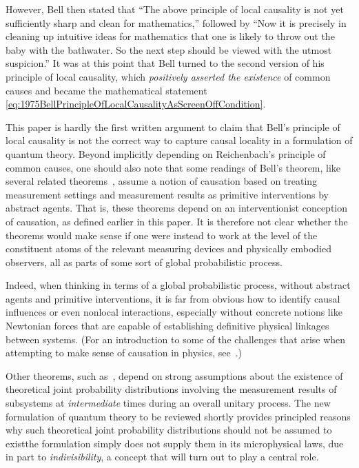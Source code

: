 \documentclass[12pt,english,prl,superscriptaddress,nobibnotes,nofootinbib]{revtex4-2}
\begin{document}
However, Bell then stated that ``The above principle of local causality
is not yet sufficiently sharp and clean for mathematics,'' followed
by ``Now it is precisely in cleaning up intuitive ideas for mathematics
that one is likely to throw out the baby with the bathwater. So the
next step should be viewed with the utmost suspicion.'' It was at
this point that Bell turned to the second version of his principle
of local causality, which \emph{positively asserted the existence}
of common causes and became the mathematical statement \eqref{eq:1975BellPrincipleOfLocalCausalityAsScreenOffCondition}.

This paper is hardly the first written argument to claim that Bell's
principle of local causality is not the correct way to capture causal
locality in a formulation of quantum theory. Beyond implicitly depending
on Reichenbach's principle of common causes, one should also note
that some readings of Bell's theorem, like several related theorems~\citep{ClauserHorneShimonyHolt:1969pettlhvt,GreenbergerHorneZeilinger:1989gbbt},
assume a notion of causation based on treating measurement settings
and measurement results as primitive interventions by abstract agents.
That is, these theorems depend on an interventionist conception of
causation, as defined earlier in this paper. It is therefore not clear
whether the theorems would make sense if one were instead to work
at the level of the constituent atoms of the relevant measuring devices
and physically embodied observers, all as parts of some sort of global
probabilistic process.

Indeed, when thinking in terms of a global probabilistic process,
without abstract agents and primitive interventions, it is far from
obvious how to identify causal influences or even nonlocal interactions,
especially without concrete notions like Newtonian forces that are
capable of establishing definitive physical linkages between systems.
(For an introduction to some of the challenges that arise when attempting
to make sense of causation in physics, see~\citep{Frisch:2024cip}.)

Other theorems, such as~\citep{BongUtrerasAlarconGhafariLiangTischlerCavalcantiPrydeWiseman:2020asngtotwfp},
depend on strong assumptions about the existence of theoretical joint
probability distributions involving the measurement results of subsystems
at \emph{intermediate} times during an overall unitary process. The
new formulation of quantum theory to be reviewed shortly provides
principled reasons why such theoretical joint probability distributions
should not be assumed to exist\textemdash the formulation simply does
not supply them in its microphysical laws, due in part to \emph{indivisibility},
a concept that will turn out to play a central role. 
\end{document}
